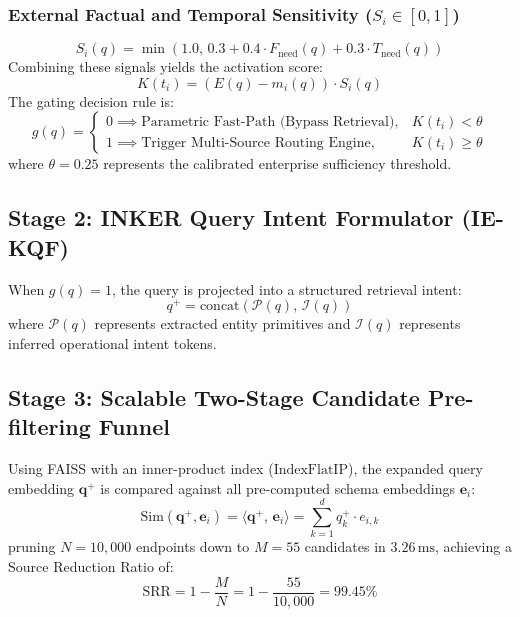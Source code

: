 \documentclass[journal,10pt,twocolumn]{IEEEtran}
\begin{document}
\subsubsection{External Factual and Temporal Sensitivity ($S_i \in [0, 1]$)}
\begin{equation}
    S_i(q) = \min\left( 1.0, \, 0.3 + 0.4 \cdot F_{\text{need}}(q) + 0.3 \cdot T_{\text{need}}(q) \right)
    \label{eq:urgency_s}
\end{equation}
Combining these signals yields the activation score:
\begin{equation}
    K(t_i) = \left( E(q) - m_i(q) \right) \cdot S_i(q)
    \label{eq:k_activation}
\end{equation}
The gating decision rule is:
\begin{equation}
    g(q) = \begin{cases} 
      0 \implies \text{Parametric Fast-Path (Bypass Retrieval)}, & K(t_i) < \theta \\
      1 \implies \text{Trigger Multi-Source Routing Engine}, & K(t_i) \ge \theta
   \end{cases}
   \label{eq:gating_rule}
\end{equation}
where $\theta = 0.25$ represents the calibrated enterprise sufficiency threshold.

\subsection{Stage 2: INKER Query Intent Formulator (IE-KQF)}
When $g(q) = 1$, the query is projected into a structured retrieval intent:
\begin{equation}
    q^+ = \text{concat}\left( \mathcal{P}(q), \, \mathcal{I}(q) \right)
\end{equation}
where $\mathcal{P}(q)$ represents extracted entity primitives and $\mathcal{I}(q)$ represents inferred operational intent tokens.

\subsection{Stage 3: Scalable Two-Stage Candidate Pre-filtering Funnel}
Using FAISS with an inner-product index ($\text{IndexFlatIP}$), the expanded query embedding $\mathbf{q}^+$ is compared against all pre-computed schema embeddings $\mathbf{e}_i$:
\begin{equation}
    \text{Sim}(\mathbf{q}^+, \mathbf{e}_i) = \langle \mathbf{q}^+, \, \mathbf{e}_i \rangle = \sum_{k=1}^d q^+_k \cdot e_{i,k}
\end{equation}
pruning $N=10,000$ endpoints down to $M=55$ candidates in $3.26\,\text{ms}$, achieving a Source Reduction Ratio of:
\begin{equation}
    \text{SRR} = 1 - \frac{M}{N} = 1 - \frac{55}{10,000} = 99.45\%
\end{equation}
\end{document}
